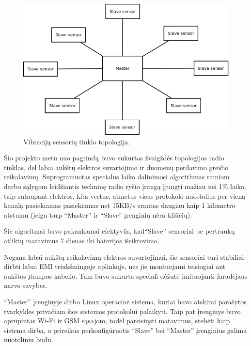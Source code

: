 \documentclass[12pt, a4paper, lithuanian, final]{article}
\begin{document}
\begin{figure}[H]
\begin{center}
\includegraphics[width=1\textwidth]{img/NorgeRail_star.png}
\caption{Vibracijų sensorių tinklo topologija.}
\end{center}
\end{figure}

Šio projekto metu nuo pagrindų buvo sukurtas žvaigždės topologijos radio tinklas, dėl labai aukštų elektros suvartojimo ir duomenų perdavimo greičio reikalavimų.
Suprogramuotas specialus laiko dalinimosi algorithmas ramiom darbo sąlygom leidžiantis techninę radio ryšio įrangą įjungti mažiau nei 1\% laiko, taip sutaupant elektros, kita vertus, atmetus visus protokolo nuostolius per vieną kanalą pasiekiamas pasiekiamas net 15KB/s srautas daugiau kaip 1 kilometro atstumu (jeigu tarp "`Master"' ir "`Slave"' įrenginių nėra kliūčių).

Šie algoritmai buvo pakankamai efektyvūs, kad"`Slave"' sensoriai be pertraukų atliktų matavimus 7 dienas iki baterijos išsikrovimo.


Negana labai aukštų reikalavimų elektros suvartojimui, šie sensoriai turi stabiliai dirbti labai EMI triukšmingoje aplinkoje, nes jie montuojami teisiogiai ant aukštos įtampos kabelio.
Tam buvo sukurta speciali dėžutė imituojanti faradėjaus narvo savybes.


"`Master"' įrenginyje dirbo Linux operacinė sistema, kuriai buvo atskirai parašytos tvarkyklės privačiam šios sistemos protokolui palaikyti.
Taip pat įrenginys buvo aprūpintas Wi-Fi ir GSM sąsajom, todėl parsisiųsti matavimus, stebėti kaip sistema dirba, o prireikus perkonfigūruotis "`Slave"' bei "`Master"' įrenginius galima nuotoliniu būdu.
\end{document}
